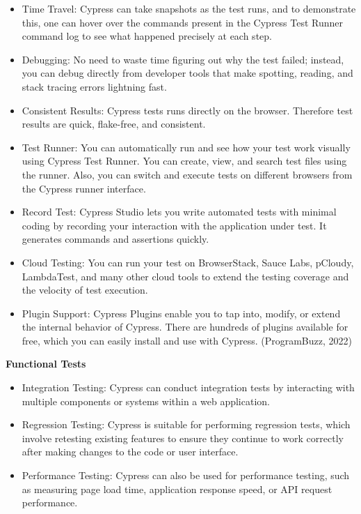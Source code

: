 \documentclass{article}
\begin{document}
	\begin{itemize}
		\item Time Travel: Cypress can take snapshots as the test runs, and to demonstrate this, one can hover over the commands present in the Cypress Test Runner command log to see what happened precisely at each step.
		
		\item Debugging: No need to waste time figuring out why the test failed; instead, you can debug directly from developer tools that make spotting, reading, and stack tracing errors lightning fast.
		\item Consistent Results: Cypress tests runs directly on the browser. Therefore test results are quick, flake-free, and consistent.
		\item Test Runner: You can automatically run and see how your test work visually using Cypress Test Runner. You can create, view, and search test files using the runner. Also, you can switch and execute tests on different browsers from the Cypress runner interface. 
		\item Record Test: Cypress Studio lets you write automated tests with minimal coding by recording your interaction with the application under test. It generates commands and assertions quickly.
		\item Cloud Testing: You can run your test on BrowserStack, Sauce Labs, pCloudy, LambdaTest, and many other cloud tools to extend the testing coverage and the velocity of test execution. 
		\item Plugin Support: Cypress Plugins enable you to tap into, modify, or extend the internal behavior of Cypress. There are hundreds of plugins available for free, which you can easily install and use with Cypress.
		(ProgramBuzz, 2022)
	\end{itemize}
	
	\textbf{Functional Tests}
	
	\begin{itemize}
		\item Integration Testing: Cypress can conduct integration tests by interacting with multiple components or systems within a web application.
		\item Regression Testing: Cypress is suitable for performing regression tests, which involve retesting existing features to ensure they continue to work correctly after making changes to the code or user interface.
		\item Performance Testing: Cypress can also be used for performance testing, such as measuring page load time, application response speed, or API request performance.
	\end{itemize}
	
\end{document}
